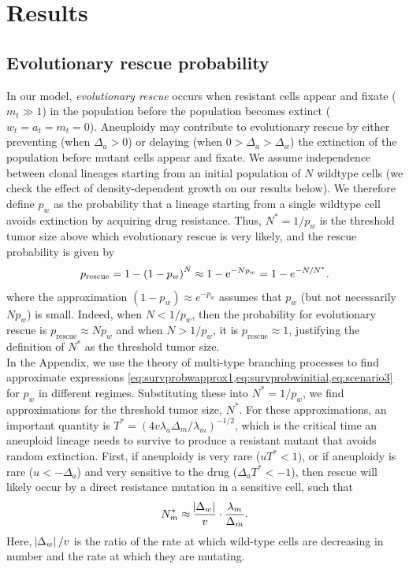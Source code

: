 \documentclass[12pt]{extarticle}
\newcommand{\e}{{\rm e}}
\newcommand{\presc}{p_\text{rescue}}
\begin{document}
\section*{Results}


\subsection*{Evolutionary rescue probability}

In our model, \emph{evolutionary rescue} occurs when resistant cells appear and fixate ($m_t \gg 1$) in the population before the population becomes extinct ($w_t=a_t=m_t=0$).
Aneuploidy may contribute to evolutionary rescue by either preventing (when $\Delta_a>0$) or delaying (when $0>\Delta_a>\Delta_w$) the extinction of the population before mutant cells appear and fixate.
We assume independence between clonal lineages starting from an initial population of $N$ wildtype cells (we check the effect of density-dependent growth on our results below).
We therefore define $p_w$ as the probability that a lineage starting from a single wildtype cell avoids extinction by acquiring drug resistance.
Thus, $N^*=1/p_w$ is the threshold tumor size above which evolutionary rescue is very likely, and the rescue probability is given by 
\begin{equation} \label{eq:rescue_prob} 
\presc = 
1-\left(1-p_w\right)^N \approx
1-\e^{-Np_w} = 
1-e^{-N/N^*} .
\end{equation}
where the approximation $(1-p_w)\approx e^{-p_w}$ assumes that $p_w$ (but not necessarily $N p_w$) is small.
Indeed, when $N<1/p_w$, then the probability for evolutionary rescue is $\presc \approx N p_w$  and when $N > 1/p_w$, it is $\presc \approx 1$, justifying the definition of $N^*$ as the threshold tumor size. 
\\

In the Appendix, we use the theory of multi-type branching processes to find approximate expressions \cref{eq:survprobwapprox1,eq:survprobwinitial,eq:scenario3} for $p_w$ in different regimes. 
Substituting these  into $N^*=1/p_w$, we find approximations for the threshold tumor size, $N^*$. 
For these approximations, an important quantity is $T^* = (4 v \lambda_a \Delta_m/\lambda_m)^{-1/2}$, which is the critical time an aneuploid lineage needs to survive to produce a resistant mutant that avoids random extinction.
First, if aneuploidy is very rare ($u T^*< 1$), or if aneuploidy is rare ($u < -\Delta_a$) and very sensitive to the drug ($\Delta_a T^* < -1$), then rescue will likely occur by a direct resistance mutation in a sensitive cell, such that 
\begin{equation} \label{eq:N_m}
N_m^* \approx \frac{\abs{\Delta_w}}{v} \cdot \frac{\lambda_m}{\Delta_m} .
\end{equation}
Here, $\abs{\Delta_w}/v$ is the ratio of the rate at which wild-type cells are decreasing in number and the rate at which they are mutating.
\end{document}
